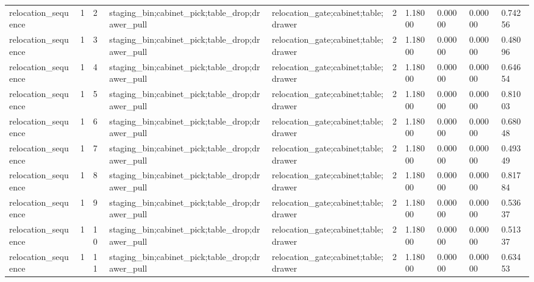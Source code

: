 \documentclass{article}
\begin{document}
\begin{table}[tbp]
{\begin{tabular}{llllllllll}
relocation\_sequence & 1 & 2 & staging\_bin;cabinet\_pick;table\_drop;drawer\_pull & relocation\_gate;cabinet;table;drawer & 2 & 1.18000 & 0.00000 & 0.00000 & 0.74256 \\
relocation\_sequence & 1 & 3 & staging\_bin;cabinet\_pick;table\_drop;drawer\_pull & relocation\_gate;cabinet;table;drawer & 2 & 1.18000 & 0.00000 & 0.00000 & 0.48096 \\
relocation\_sequence & 1 & 4 & staging\_bin;cabinet\_pick;table\_drop;drawer\_pull & relocation\_gate;cabinet;table;drawer & 2 & 1.18000 & 0.00000 & 0.00000 & 0.64654 \\
relocation\_sequence & 1 & 5 & staging\_bin;cabinet\_pick;table\_drop;drawer\_pull & relocation\_gate;cabinet;table;drawer & 2 & 1.18000 & 0.00000 & 0.00000 & 0.81003 \\
relocation\_sequence & 1 & 6 & staging\_bin;cabinet\_pick;table\_drop;drawer\_pull & relocation\_gate;cabinet;table;drawer & 2 & 1.18000 & 0.00000 & 0.00000 & 0.68048 \\
relocation\_sequence & 1 & 7 & staging\_bin;cabinet\_pick;table\_drop;drawer\_pull & relocation\_gate;cabinet;table;drawer & 2 & 1.18000 & 0.00000 & 0.00000 & 0.49349 \\
relocation\_sequence & 1 & 8 & staging\_bin;cabinet\_pick;table\_drop;drawer\_pull & relocation\_gate;cabinet;table;drawer & 2 & 1.18000 & 0.00000 & 0.00000 & 0.81784 \\
relocation\_sequence & 1 & 9 & staging\_bin;cabinet\_pick;table\_drop;drawer\_pull & relocation\_gate;cabinet;table;drawer & 2 & 1.18000 & 0.00000 & 0.00000 & 0.53637 \\
relocation\_sequence & 1 & 10 & staging\_bin;cabinet\_pick;table\_drop;drawer\_pull & relocation\_gate;cabinet;table;drawer & 2 & 1.18000 & 0.00000 & 0.00000 & 0.51337 \\
relocation\_sequence & 1 & 11 & staging\_bin;cabinet\_pick;table\_drop;drawer\_pull & relocation\_gate;cabinet;table;drawer & 2 & 1.18000 & 0.00000 & 0.00000 & 0.63453 \\
\bottomrule
\end{tabular}
}
\end{table}

\clearpage
\end{document}
